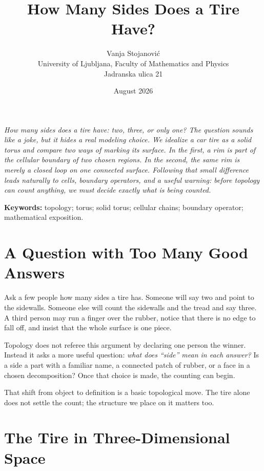 \documentclass[12pt]{article}
\title{\bfseries How Many Sides Does a Tire Have?}
\author{Vanja Stojanovi\'c\\
University of Ljubljana, Faculty of Mathematics and Physics\\
Jadranska ulica 21}
\date{August 2026}
\begin{document}
\maketitle

\doublespacing

\begin{center}
\begin{minipage}{0.86\linewidth}
\small\itshape
How many sides does a tire have: two, three, or only one?  The question sounds
like a joke, but it hides a real modeling choice.  We idealize a car tire as a
solid torus and compare two ways of marking its surface.  In the first, a rim
is part of the cellular boundary of two chosen regions.  In the second, the same
rim is merely a closed loop on one connected surface.  Following that small
difference leads naturally to cells, boundary operators, and a useful warning:
before topology can count anything, we must decide exactly what is being
counted.
\end{minipage}
\end{center}
\noindent\textbf{Keywords:} topology; torus; solid torus; cellular chains;
boundary operator; mathematical exposition.

\vspace{0.6em}

\section{A Question with Too Many Good Answers}

Ask a few people how many sides a tire has.  Someone will say two and point to
the sidewalls.  Someone else will count the sidewalls and the tread and say
three.  A third person may run a finger over the rubber, notice that there is no
edge to fall off, and insist that the whole surface is one piece.

Topology does not referee this argument by declaring one person the winner.
Instead it asks a more useful question: \emph{what does ``side'' mean in each
answer?}  Is a side a part with a familiar name, a connected patch of rubber, or
a face in a chosen decomposition?  Once that choice is made, the counting can
begin.

That shift from object to definition is a basic topological move.  The tire
alone does not settle the count; the structure we place on it matters too.

\section{The Tire in Three-Dimensional Space}
\end{document}
